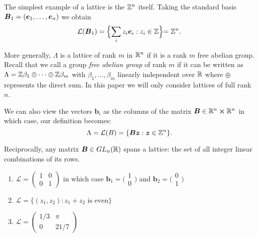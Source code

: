 \begin{example}
    The simplest example of a lattice is the $\mathbb{Z}^n$ itself. Taking the standard basis $\boldsymbol{B}_1 = (\boldsymbol{e}_1, \dots, \boldsymbol{e}_n)$ we obtain
	\[ \mathcal{L}(\boldsymbol{B}_1) = \Bigl\{ \sum_i z_i \boldsymbol{e}_i : z_i \in \mathbb{Z} \Bigl\} = \mathbb{Z}^n. \]
\end{example}
More generally, $\Lambda$ is a lattice of rank $m$ in $\mathbb{R}^n$ if it is a rank $m$ free abelian group. Recall that we call a group \textit{free abelian group} of rank $m$ if it can be written as $\Lambda = \mathbb{Z}\beta_1 \oplus \cdots \oplus\mathbb{Z}\beta_m$ with $\beta_1, \dots, \beta_m$ linearly independent over $\mathbb{R}$ where $\oplus$ represents the direct sum. In this paper we will only consider lattices of full rank $n$. 

\begin{remark}
    We can also view the vectors $\bm{b}_i$ as the columns of the matrix $\boldsymbol{B} \in \mathbb{R}^n \cross \mathbb{R}^n$ in which case, our definition becomes:
    $$\Lambda = \mathcal{L}(B) = \{\boldsymbol{Bz} :  \boldsymbol{z} \in \mathbb{Z}^n \}.$$
\end{remark}

Reciprocally, any matrix $\boldsymbol{B} \in GL_n(\mathbb{R})$ spans a lattice: the set of all integer linear combinations of its rows.

\begin{example}
\begin{enumerate}
    \item $\mathcal{L} = \begin{pmatrix}
        1 & 0\\
        0 & 1
	\end{pmatrix}$ in which case $\bm{b}_1 = \big(\begin{smallmatrix}
          1\\
          0
	\end{smallmatrix}\big)$ and $\bm{b}_2 = \big(\begin{smallmatrix}
          0\\
          1
        \end{smallmatrix}\big)$
    \item $\mathcal{L} = \{(z_1,z_2) : z_1 + z_2 \text{ is even}\}$
    \item $\mathcal{L} = \begin{pmatrix}
        1/3 & \pi\\
        0 & 21/7
        \end{pmatrix}$
\end{enumerate}
\end{example}


